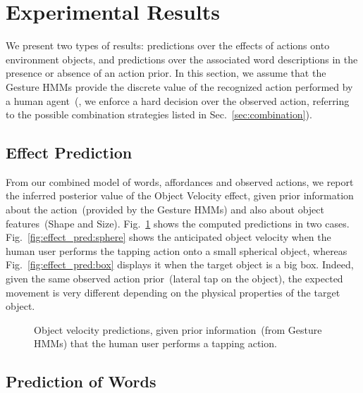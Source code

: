 
\section{Experimental Results}

We present two types of results: predictions over the effects of actions onto environment objects, and predictions over the associated word descriptions in the presence or absence of an action prior. In this section, we assume that the Gesture \acp{HMM} provide the discrete value of the recognized action performed by a human agent~(\ie, we enforce a hard decision over the observed action, referring to the possible combination strategies listed in Sec.~\ref{sec:combination}).

\subsection{Effect Prediction}

From our combined model of words, affordances and observed actions, we report the inferred posterior value of the Object Velocity effect, given prior information about the action~(provided by the Gesture \acp{HMM}) and also about object features~(Shape and Size). Fig.~\ref{fig:effect_pred} shows the computed predictions in two cases. Fig.~\ref{fig:effect_pred:sphere} shows the anticipated object velocity when the human user performs the tapping action onto a small spherical object, whereas Fig.~\ref{fig:effect_pred:box} displays it when the target object is a big box. Indeed, given the same observed action prior~(lateral tap on the object), the expected movement is very different depending on the physical properties of the target object.

\begin{figure}
    \centering
     \quad
    \caption{Object velocity predictions, given prior information~(from Gesture \acp{HMM}) that the human user performs a tapping action.}
    \label{fig:effect_pred}
\end{figure}

\subsection{Prediction of Words}

